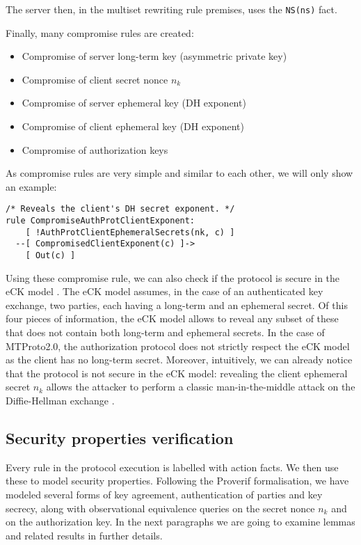 The server then, in the multiset rewriting rule premises, uses the \lstinline{NS(ns)} fact.

Finally, many compromise rules are created:
\begin{itemize}
  \item Compromise of server long-term key (asymmetric private key)
  \item Compromise of client secret nonce $n_k$
  \item Compromise of server ephemeral key (DH exponent)
  \item Compromise of client ephemeral key (DH exponent)
  \item Compromise of authorization keys
\end{itemize}

As compromise rules are very simple and similar to each other, we will only show an example:

\begin{lstlisting}
/* Reveals the client's DH secret exponent. */
rule CompromiseAuthProtClientExponent:
    [ !AuthProtClientEphemeralSecrets(nk, c) ]
  --[ CompromisedClientExponent(c) ]->
    [ Out(c) ]
\end{lstlisting}

Using these compromise rule, we can also check if the protocol is secure in the eCK model \cite{eCK}. The eCK model assumes, in the case of an authenticated key exchange, two parties, each having a long-term and an ephemeral secret. Of this four pieces of information, the eCK model allows to reveal any subset of these that does not contain both long-term and ephemeral secrets.
In the case of MTProto2.0, the authorization protocol does not strictly respect the eCK model as the client has no long-term secret. Moreover, intuitively, we can already notice that the protocol is not secure in the eCK model: revealing the client ephemeral secret $n_k$ allows the attacker to perform a classic man-in-the-middle attack on the Diffie-Hellman exchange \cite{MITM-DH}.

\subsection{Security properties verification}
Every rule in the protocol execution is labelled with action facts. We then use these to model security properties. Following the Proverif formalisation, we have modeled several forms of key agreement, authentication of parties and key secrecy, along with observational equivalence queries on the secret nonce $n_k$ and on the authorization key. In the next paragraphs we are going to examine lemmas and related results in further details.

